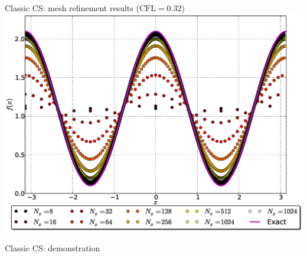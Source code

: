 \documentclass{beamer}
\begin{document}

\begin{frame}{Classic CS: mesh refinement results ($\mathrm{CFL} = 0.32$)}\vspace{-0.2em}
    \includegraphics[width=\textwidth]{graphics/plot_-_ClassicCS_cosine2x_Nxall} 
\end{frame}


\begin{frame}{Classic CS: demonstration} 


\end{frame}

\end{document}
